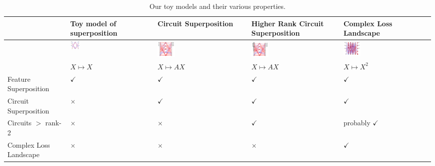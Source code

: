 \documentclass{article}
\theoremstyle{plain}
\theoremstyle{definition}
\theoremstyle{remark}
\begin{document}
\begin{table}[htb]
    \centering
    \begin{tabularx}{\textwidth}{X X X X X}  %
        \toprule
         & Toy model of superposition & Circuit Superposition & Higher Rank Circuit Superposition & Complex Loss Landscape \\  
        \midrule

        \hline
        & \includegraphics[width=0.12\textwidth]{../figures/2a_toy_models_setup.pdf} &
        \includegraphics[width=0.2\textwidth]{../figures/2b_toy_models_setup.pdf} &
        \includegraphics[width=0.2\textwidth]{../figures/2c_toy_models_setup.pdf} &
        \includegraphics[width=0.2\textwidth]{../figures/2d_toy_models_setup.pdf} \\
         & $X \mapsto X$ & $X \mapsto A X$ & $X \mapsto A X$ & $X \mapsto X^2$ \\  
        Feature Superposition & $\checkmark$ & $\checkmark$ & $\checkmark$ & $\checkmark$ \\  
        Circuit Superposition & $\times$ & $\checkmark$ & $\checkmark$ & $\checkmark$ \\  
        Circuits $>$ rank-2 & $\times$ & $\times$ & $\checkmark$ & probably $\checkmark$ \\  
        Complex Loss Landscape & $\times$ & $\times$ & $\times$ & $\checkmark$ \\  
        \bottomrule
    \end{tabularx}
    \caption{Our toy models and their various properties.}
    \label{tab:toy_models}
\end{table}
\end{document}
